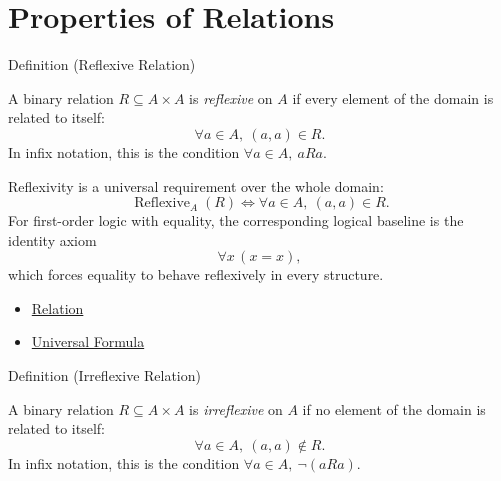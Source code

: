 
\section{Properties of Relations}


\begin{definitionbox}{Definition (Reflexive Relation)}
\begin{definition}\label{def:reflexive}
A binary relation $R\subseteq A\times A$ is \emph{reflexive} on $A$ if every
element of the domain is related to itself:
\[
  \forall a\in A,\ (a,a)\in R.
\]
In infix notation, this is the condition $\forall a\in A,\ aRa$.
\end{definition}
\end{definitionbox}


\begin{remark*}
Reflexivity is a universal requirement over the whole domain:
\[
  \operatorname{Reflexive}_A(R)
  \iff
  \forall a\in A,\ (a,a)\in R.
\]
For first-order logic with equality, the corresponding logical baseline is
the identity axiom
\[
  \forall x\,(x=x),
\]
which forces equality to behave reflexively in every structure.
\end{remark*}

\begin{dependencies}
\begin{itemize}
  \item \hyperref[def:relation]{Relation}
  \item \hyperref[def:universal-q]{Universal Formula}
\end{itemize}
\end{dependencies}

\begin{definitionbox}{Definition (Irreflexive Relation)}
\begin{definition}\label{def:irreflexive}
A binary relation $R\subseteq A\times A$ is \emph{irreflexive} on $A$ if no
element of the domain is related to itself:
\[
  \forall a\in A,\ (a,a)\notin R.
\]
In infix notation, this is the condition $\forall a\in A,\ \neg(aRa)$.
\end{definition}
\end{definitionbox}


